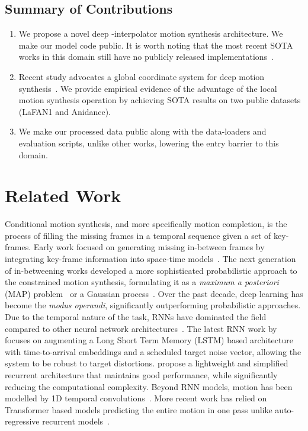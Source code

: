 \documentclass[letterpaper]{article} \usepackage[]{aaai23}  \usepackage{times}  \usepackage{helvet}  \usepackage{courier}  \usepackage[hyphens]{url}  \usepackage{graphicx} \urlstyle{rm} \def\UrlFont{\rm}  \usepackage{natbib}  \usepackage{caption} \frenchspacing  \setlength{\pdfpagewidth}{8.5in} \setlength{\pdfpageheight}{11in}
\begin{document}
\subsection{Summary of Contributions}



\begin{enumerate}
    \item We propose a novel deep -interpolator motion synthesis architecture. We make our model code public. It is worth noting that the most recent SOTA works in this domain still have no publicly released implementations~\cite{harvey2020robust, duan2021singleshot}.
    \item Recent study advocates a global coordinate system for deep motion synthesis~\cite{duan2021singleshot}. We provide empirical evidence of the advantage of the local motion synthesis operation by achieving SOTA results on two public datasets (LaFAN1 and Anidance).
    \item We make our processed data public along with the data-loaders and evaluation scripts, unlike other works, lowering the entry barrier to this domain.
\end{enumerate}

\section{Related Work}

Conditional motion synthesis, and more specifically motion completion, is the process of filling the missing frames in a temporal sequence given a set of key-frames. Early work focused on generating missing in-between frames by integrating key-frame information into space-time  models~\cite{witkin1988spacetime, ngo1993spacetime}. The next generation of in-betweening works developed a more sophisticated probabilistic approach to the constrained motion synthesis, formulating it as a \emph{maximum a posteriori} (MAP) problem~\cite{chai2007constraint} or a Gaussian process~\cite{grochow2004style, wang2007gaussian}. Over the past decade, deep learning has become the \emph{modus operandi}, significantly outperforming probabilistic approaches. Due to the temporal nature of the task, RNNs have dominated the field compared to other neural network architectures~\cite{holden2016framework, harvey2018recurrent}. The latest RNN work by~\citet{harvey2020robust} focuses on augmenting a Long Short Term Memory (LSTM) based architecture with time-to-arrival embeddings and a scheduled target noise vector, allowing the system to be robust to target distortions. \citet{gelejein2021lightweight} propose a lightweight and simplified recurrent architecture that maintains good performance, while significantly reducing the computational complexity. Beyond RNN models, motion has been modelled by 1D temporal convolutions~\cite{holden2015learning}. More recent work has relied on Transformer based models predicting the entire motion in one pass unlike auto-regressive recurrent models~\citep{devlin2018bert,duan2021singleshot}. 
\end{document}
